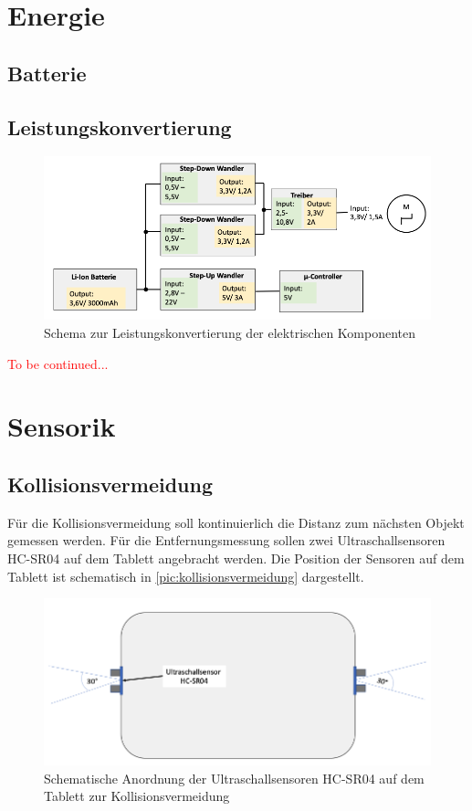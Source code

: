 \section{Energie}
\subsection{Batterie}
\subsection{Leistungskonvertierung}
\begin{figure}[h]
	\begin{center}
		\includegraphics[width=17cm]{leistungskonvertierung.png}
		\caption{Schema zur Leistungskonvertierung der elektrischen Komponenten}
		\label{pic:leistungskonvertierung}
	\end{center}
\end{figure}

\textcolor{red}{To be continued...}

\section{Sensorik}
\subsection{Kollisionsvermeidung}
Für die Kollisionsvermeidung soll kontinuierlich die Distanz zum nächsten Objekt gemessen werden. Für die Entfernungsmessung sollen zwei Ultraschallsensoren HC-SR04 auf dem Tablett angebracht werden. Die Position der Sensoren auf dem Tablett ist schematisch in \autoref{pic:kollisionsvermeidung} dargestellt.  
\begin{figure}[h]
	\begin{center}
		\includegraphics[width=17cm]{kollisionsvermeidung.png}
		\caption{Schematische Anordnung der Ultraschallsensoren HC-SR04 auf dem Tablett zur Kollisionsvermeidung}
		\label{pic:kollisionsvermeidung}
	\end{center}
\end{figure}

